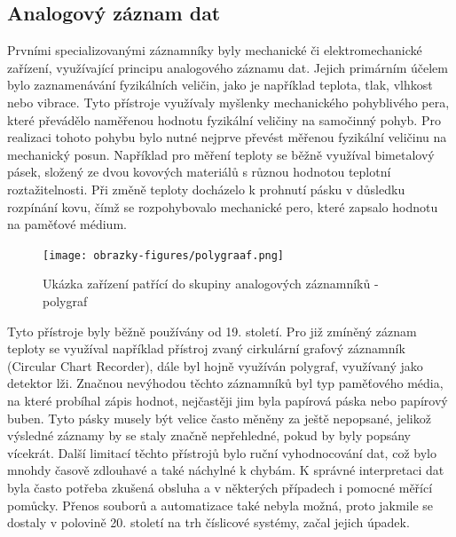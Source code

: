   
\subsection{Analogový záznam dat} %
\label{moznosti_zaznamu_dat}
Prvními specializovanými záznamníky byly mechanické či elektromechanické zařízení, využívající principu analogového záznamu dat. Jejich primárním účelem bylo zaznamenávání 
fyzikálních veličin, jako je například teplota, tlak, vlhkost nebo vibrace. Tyto přístroje využívaly myšlenky mechanického pohyblivého pera, které převádělo naměřenou 
hodnotu fyzikální veličiny na samočinný pohyb. Pro realizaci tohoto pohybu bylo nutné nejprve převést měřenou fyzikální veličinu na mechanický posun. Například pro měření 
teploty se běžně využíval bimetalový pásek, složený ze dvou kovových materiálů s různou hodnotou teplotní roztažitelnosti. Při změně teploty docházelo k prohnutí pásku v 
důsledku rozpínání kovu, čímž se rozpohybovalo mechanické pero, které zapsalo hodnotu na paměťové médium. 


\begin{figure}[h] %
    \centering
    \texttt{[image: obrazky-figures/polygraaf.png]}
    \caption{Ukázka zařízení patřící do skupiny analogových záznamníků - polygraf \cite{polygraph_picture}}
    \label{fig:polygraaf}
\end{figure}


Tyto přístroje byly běžně používány od 19. století. Pro již zmíněný záznam teploty se využíval například přístroj zvaný cirkulární grafový záznamník (Circular Chart Recorder), 
dále byl hojně využíván polygraf, využívaný jako detektor lži. Značnou nevýhodou těchto záznamníků byl typ paměťového média, na které probíhal zápis hodnot, nejčastěji jim 
byla papírová páska nebo papírový buben. Tyto pásky musely být velice často měněny za ještě nepopsané, jelikož výsledné záznamy by se staly značně nepřehledné, pokud by byly 
popsány vícekrát.
Další limitací těchto přístrojů bylo ruční vyhodnocování dat, což bylo mnohdy časově zdlouhavé a také náchylné k chybám. K správné interpretaci dat byla často potřeba 
zkušená obsluha a v některých případech i pomocné měřící pomůcky. Přenos souborů a automatizace také nebyla možná, proto jakmile se dostaly v polovině 20. století na trh 
číslicové systémy, začal jejich úpadek. \cite{newcastle_history_of_digital_computers, florian_prechod_a_analog_do_digital}

